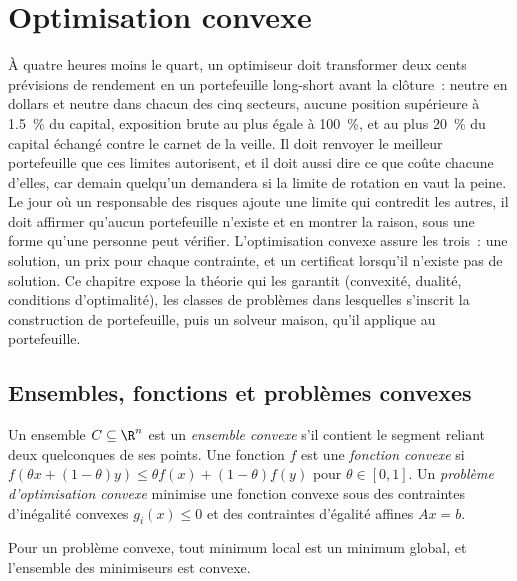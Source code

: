 \chapter{Optimisation convexe}\label{ch:qm:convex-optimisation}

À quatre heures moins le quart, un optimiseur doit transformer deux cents prévisions de rendement en un portefeuille long-short avant la clôture~: neutre en dollars et
neutre dans chacun des cinq secteurs, aucune position supérieure à 1.5~\% du capital, exposition brute au plus égale à 100~\%, et au plus 20~\% du capital échangé
contre le carnet de la veille. Il doit renvoyer le meilleur portefeuille que ces limites autorisent, et il doit aussi dire ce que coûte chacune d'elles, car demain
quelqu'un demandera si la limite de rotation en vaut la peine. Le jour où un responsable des risques ajoute une limite qui contredit les autres, il doit affirmer
qu'aucun portefeuille n'existe et en montrer la raison, sous une forme qu'une personne peut vérifier. L'optimisation convexe assure les trois~: une solution, un prix
pour chaque contrainte, et un certificat lorsqu'il n'existe pas de solution. Ce chapitre expose la théorie qui les garantit (convexité, dualité, conditions d'optimalité),
les classes de problèmes dans lesquelles s'inscrit la construction de portefeuille, puis un solveur maison, qu'il applique au portefeuille.

\section{Ensembles, fonctions et problèmes convexes}

\begin{definition}\label{def:qm:convex-optimisation:convex}
Un ensemble $C \subseteq \R^n$ est un \emph{ensemble convexe} s'il contient le segment reliant deux quelconques de ses points. Une fonction $f$ est une \emph{fonction
convexe} si $f(\theta x + (1 - \theta)y) \le \theta f(x) + (1 - \theta)f(y)$ pour $\theta \in [0, 1]$. Un \emph{problème d'optimisation convexe}
minimise une fonction convexe sous des contraintes d'inégalité convexes $g_i(x) \le 0$ et des contraintes d'égalité affines
$Ax = b$.
\end{definition}

\begin{proposition}\label{prop:qm:convex-optimisation:local}
Pour un problème convexe, tout minimum local est un minimum global, et l'ensemble des minimiseurs est convexe.
\end{proposition}

